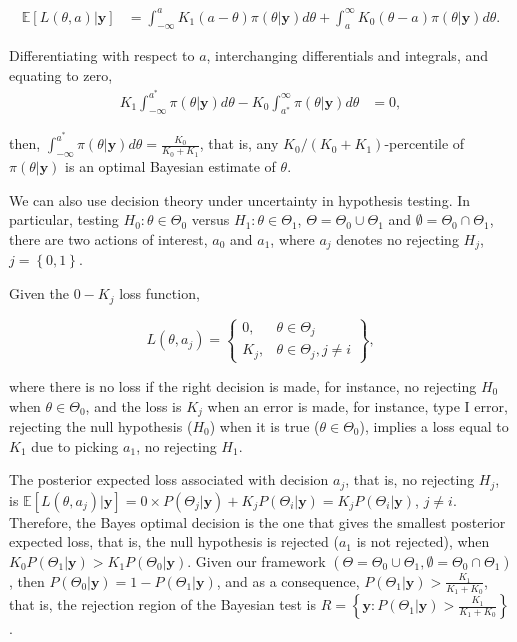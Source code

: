\begin{itemize}
	\begin{align*}
		\mathbb{E}[L(\theta, a)|\mathbf{y}]&=\int_{-\infty}^a K_1(a-\theta)\pi(\theta|\mathbf{y})d\theta + \int_a^{\infty} K_0(\theta-a)\pi(\theta|\mathbf{y})d\theta. 
	\end{align*}
	
	Differentiating with respect to $a$, interchanging differentials and integrals, and equating to zero,
	\begin{align*}
		K_1\int_{-\infty}^{a^*} \pi(\theta|\mathbf{y})d\theta-K_0\int_{a^*}^{\infty} \pi(\theta|\mathbf{y})d\theta&=0,
	\end{align*}
	
	then, $\int_{-\infty}^{a^*} \pi(\theta|\mathbf{y})d\theta=\frac{K_0}{K_0+K_1}$, that is, any $K_0/(K_0+K_1)$-percentile of $\pi(\theta|\mathbf{y})$ is an optimal Bayesian estimate of $\theta$. 
\end{itemize}

We can also use decision theory under uncertainty in hypothesis testing. In particular, testing $H_0:\theta\in\Theta_0$ versus $H_1:\theta\in\Theta_1$, $\Theta=\Theta_0 \cup \Theta_1$ and $\emptyset=\Theta_0 \cap \Theta_1$, there are two actions of interest, $a_0$ and $a_1$, where $a_j$ denotes no rejecting $H_j$, $j=\left\{0,1\right\}$. 

Given the $0-K_j$ loss function,

\begin{equation*}
	L(\theta,a_j)=\begin{Bmatrix} 0, & \theta\in\Theta_j\\
		K_j, & \theta\in\Theta_j, j\neq i \end{Bmatrix},
\end{equation*}

where there is no loss if the right decision is made, for instance, no rejecting $H_0$ when $\theta\in\Theta_0$, and the loss is $K_j$ when an error is made, for instance, type I error, rejecting the null hypothesis ($H_0$) when it is true ($\theta\in\Theta_0$), implies a loss equal to $K_1$ due to picking $a_1$, no rejecting $H_1$. 

The posterior expected loss associated with decision $a_j$, that is, no rejecting $H_j$, is $\mathbb{E}[L(\theta,a_j)|\mathbf{y}]=0\times P(\Theta_j|\mathbf{y}) + K_jP(\Theta_i|\mathbf{y})=K_jP(\Theta_i|\mathbf{y})$, $j\neq i$. Therefore, the Bayes optimal decision is the one that gives the smallest posterior expected loss, that is, the null hypothesis is rejected ($a_1$ is not rejected), when $K_0P(\Theta_1|\mathbf{y}) > K_1P(\Theta_0|\mathbf{y})$. Given our framework $(\Theta=\Theta_0 \cup \Theta_1, \emptyset=\Theta_0 \cap \Theta_1)$, then $P(\Theta_0|\mathbf{y})=1-P(\Theta_1|\mathbf{y})$, and as a consequence, $P(\Theta_1|\mathbf{y})>\frac{K_1}{K_1+K_0}$, that is, the rejection region of the Bayesian test is $R=\left\{\mathbf{y}:P(\Theta_1|\mathbf{y})>\frac{K_1}{K_1+K_0}\right\}$.


